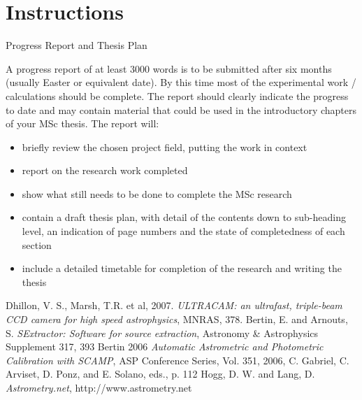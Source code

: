 \documentclass[a4paper,10pt]{article}
\begin{document}
\section{Instructions}

Progress Report and Thesis Plan

A progress report of at least 3000 words is to be submitted after 
six months (usually Easter or equivalent date). By this time most of 
the experimental work / calculations should be complete. The report 
should clearly indicate the progress to date and may contain 
material that could be used in the introductory chapters of your MSc 
thesis. The report will:

\begin{itemize} 
\item briefly review the chosen project field, putting the work in context 
\item report on the research work completed 
\item show what still needs to be done to complete the MSc 
research 
\item contain a draft thesis plan, with detail of the 
contents down to sub-heading level, an indication of page numbers 
and the state of completedness of each section 
\item include a detailed timetable for completion of the research and writing the 
thesis \end{itemize}

\begin{thebibliography}{10}
	Dhillon, V. S., Marsh, T.R. et al, 2007. \emph{ULTRACAM: an ultrafast, triple-beam CCD camera for high speed astrophysics}, MNRAS, 378.
	Bertin, E. and {Arnouts}, S. \emph{SExtractor: Software for source extraction}, Astronomy \& Astrophysics Supplement 317, 393
	Bertin 2006 \emph{Automatic Astrometric and Photometric Calibration with SCAMP}, ASP Conference Series, Vol. 351, 2006, C. Gabriel, C. Arviset, D. Ponz, and E. Solano, eds., p. 112 
	Hogg, D. W. and Lang, D. \emph{Astrometry.net}, http://www.astrometry.net 
\end{thebibliography}
\end{document}
